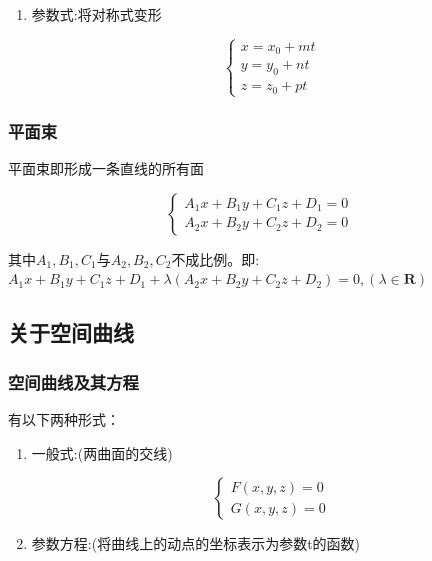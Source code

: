 \documentclass[UTF8]{ctexbook}
\newcommand{\mathRealNumberCollection}{\mathbf{R}}
\begin{document}
{{{{\begin{enumerate}
{              $\frac{x - x_0}{m} = \frac{y - y_0}{n} = \frac{z - z_0}{p} = t$
              }
        \item {
              参数式:将对称式变形

              $$
                \begin{cases}
                  x = x_0 + mt \\
                  y = y_0 + nt \\
                  z = z_0 + pt
                \end{cases}
              $$
              }
      \end{enumerate}
    }%

    \subsubsection{平面束}{
      平面束即形成一条直线的所有面

      $$
        \begin{cases}
          A_1x + B_1y + C_1z + D_1 = 0 \\
          A_2x + B_2y + C_2z + D_2 = 0
        \end{cases}
      $$

      其中$A_1,B_1,C_1$与$A_2,B_2,C_2$不成比例。即:$A_1x + B_1y + C_1z + D_1 + \lambda(A_2x + B_2y + C_2z + D_2) = 0, (\lambda \in \mathRealNumberCollection)$
    }%

  }%

  \subsection{关于空间曲线}{

    \subsubsection{空间曲线及其方程}{
      有以下两种形式：

      \begin{enumerate}
        \item {
              一般式:(两曲面的交线)

              $$
                \begin{cases}
                  F(x,y,z) = 0 \\
                  G(x,y,z) = 0
                \end{cases}
              $$
              }
        \item {
              参数方程:(将曲线上的动点的坐标表示为参数t的函数)

}
\end{enumerate}}}}}
\end{document}
